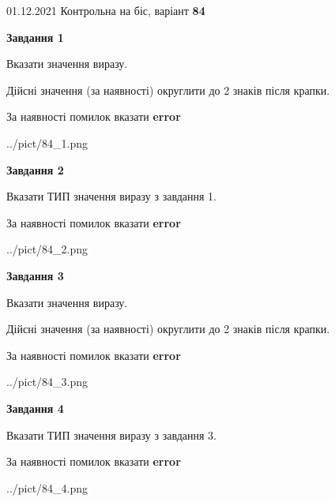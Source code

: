 \documentclass[11pt, ukrainian]{article}
\begin{document}
{01.12.2021 Контрольна на біс, варіант  \No \textbf { 84 }\par}
{
\begin {large}
{\begin {center}\textbf{Завдання 1}\end {center}}\par
Вказати значення виразу. \par
Дійсні значення (за наявності) округлити до 2 знаків після крапки. \par
За наявності помилок вказати \textbf{error}

\begin{center}
	{../pict/84_1.png}
\end{center}
\newpage

{\begin {center}\textbf{Завдання 2}\end {center}}\par
Вказати ТИП значення виразу з завдання 1. \par
За наявності помилок вказати \textbf{error}

\begin{center}
	{../pict/84_2.png}
\end{center}
\newpage

{\begin {center}\textbf{Завдання 3}\end {center}}\par
Вказати значення виразу. \par
Дійсні значення (за наявності) округлити до 2 знаків після крапки. \par
За наявності помилок вказати \textbf{error}

\begin{center}
	{../pict/84_3.png}
\end{center}
\newpage

{\begin {center}\textbf{Завдання 4}\end {center}}\par
Вказати ТИП значення виразу з завдання 3. \par
За наявності помилок вказати \textbf{error}

\begin{center}
	{../pict/84_4.png}
\end{center}
\newpage


\end{large}}
\end{document}
